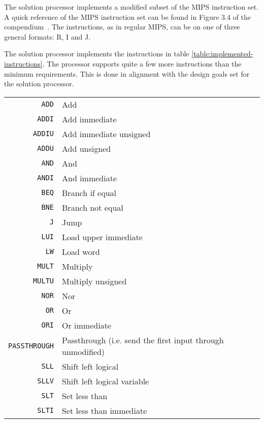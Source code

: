 The solution processor implements a modified subset of the MIPS instruction set.
A quick reference of the MIPS instruction set can be found in Figure 3.4 of the compendium~\cite[p.112]{compendium}.
The instructions, as in regular MIPS, can be on one of three general formats: R, I and J.

The solution processor implements the instructions in table \vref{table:implemented-instructions}.
The processor supports quite a few more instructions than the minimum requirements.
This is done in alignment with the design goals set for the solution processor.

\begin{table}[h]
    \begin{center}
        \begin{tabular}{r|l}
            \texttt{ADD} & Add \\
            \texttt{ADDI} & Add immediate \\
            \texttt{ADDIU} & Add immediate unsigned \\
            \texttt{ADDU} & Add unsigned \\
            \texttt{AND} & And \\
            \texttt{ANDI} & And immediate \\
            \texttt{BEQ} & Branch if equal \\
            \texttt{BNE} & Branch not equal \\
            \texttt{J} & Jump \\
            \texttt{LUI} & Load upper immediate \\
            \texttt{LW} & Load word \\
            \texttt{MULT} & Multiply \\
            \texttt{MULTU} & Multiply unsigned \\
            \texttt{NOR} & Nor \\
            \texttt{OR} & Or \\
            \texttt{ORI} & Or immediate \\
            \texttt{PASSTHROUGH} & Passthrough (i.e. send the first input through unmodified) \\
            \texttt{SLL} & Shift left logical \\
            \texttt{SLLV} & Shift left logical variable \\
            \texttt{SLT} & Set less than \\
            \texttt{SLTI} & Set less than immediate \\

\end{tabular}
\end{center}
\end{table}
